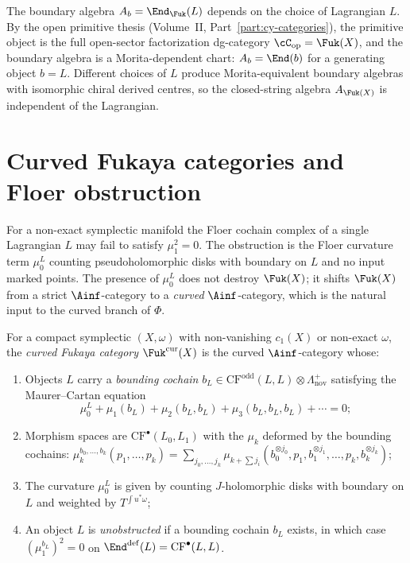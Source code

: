\begin{remark}
\label{rem:fukaya-morita}
The boundary algebra $A_b = \End_{\Fuk}(L)$ depends on the choice
of Lagrangian $L$. By the open primitive thesis (Volume~II,
Part~\ref{part:cy-categories}), the primitive object is the full open-sector factorization
dg-category $\cC_{\mathrm{op}} = \Fuk(X)$, and the boundary
algebra is a Morita-dependent chart: $A_b = \End(b)$ for a
generating object $b = L$. Different choices of $L$ produce
Morita-equivalent boundary algebras with isomorphic chiral derived
centres, so the closed-string algebra $A_{\Fuk(X)}$ is
independent of the Lagrangian.
\end{remark}


\section{Curved Fukaya categories and Floer obstruction}
\label{sec:curved-fukaya}

For a non-exact symplectic manifold the Floer cochain complex of a
single Lagrangian $L$ may fail to satisfy $\mu_1^2 = 0$. The
obstruction is the Floer curvature term $\mu_0^L$ counting
pseudoholomorphic disks with boundary on $L$ and no input marked
points. The presence of $\mu_0^L$ does not destroy $\Fuk(X)$; it
shifts $\Fuk(X)$ from a strict $\Ainf$-category to a
\emph{curved} $\Ainf$-category, which is the natural input to the
curved branch of $\Phi$.

\begin{definition}
\label{def:curved-fukaya}
For a compact symplectic $(X, \omega)$ with non-vanishing
$c_1(X)$ or non-exact $\omega$, the \emph{curved Fukaya category}
$\Fuk^{\mathrm{cur}}(X)$ is the curved $\Ainf$-category whose:
\begin{enumerate}[label=(\roman*)]
 \item Objects $L$ carry a \emph{bounding cochain} $b_L \in
 \mathrm{CF}^{\mathrm{odd}}(L,L) \otimes \Lambda_{\mathrm{nov}}^+$
 satisfying the Maurer--Cartan equation
 \[
 \mu_0^L + \mu_1(b_L) + \mu_2(b_L, b_L)
 + \mu_3(b_L, b_L, b_L) + \cdots = 0;
 \]
 \item Morphism spaces are $\mathrm{CF}^\bullet(L_0, L_1)$ with
 the $\mu_k$ deformed by the bounding cochains:
 $\mu_k^{b_0, \ldots, b_k}(p_1, \ldots, p_k)
 = \sum_{j_0, \ldots, j_k} \mu_{k + \sum j_i}(b_0^{\otimes j_0},
 p_1, b_1^{\otimes j_1}, \ldots, p_k, b_k^{\otimes j_k})$;
 \item The curvature $\mu_0^L$ is given by counting
 $J$-holomorphic disks with boundary on $L$ and weighted by
 $T^{\int u^*\omega}$;
 \item An object $L$ is \emph{unobstructed} if a bounding cochain
 $b_L$ exists, in which case $(\mu_1^{b_L})^2 = 0$ on
 $\End^{\mathrm{def}}(L) = \mathrm{CF}^\bullet(L,L)$.
\end{enumerate}
\end{definition}

